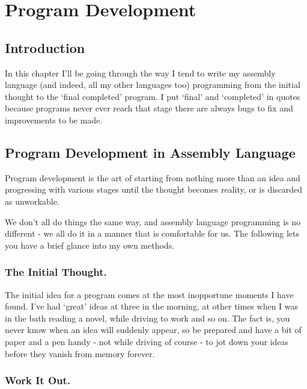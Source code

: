 \chapter{Program Development}

\section{Introduction}
\label{ch14-intro}%

In this chapter I'll be going through the way I tend to write my
    assembly language (and indeed, all my other languages too) programming
    from the initial thought to the `final completed' program. I put `final'
    and `completed' in quotes because programs never ever reach that stage
    there are always bugs to fix and improvements to be made.

\section{Program Development in Assembly Language}
\label{ch14-program-development}%

Program development is the art of starting from nothing more than an
    idea and progressing with various stages until the thought becomes
    reality, or is discarded as unworkable.

We don't all do things the same way, and assembly language
    programming is no different -{} we all do it in a manner that is comfortable
    for us. The following lets you have a brief glance into my own
    methods.

\subsection{The Initial Thought.}
\label{ch14-initial-thought}%

The initial idea for a program comes at the most inopportune
      moments I have found. I've had `great' ideas at three in the morning, at
      other times when I was in the bath reading a novel, while driving to
      work and so on. The fact is, you never know when an idea will suddenly
      appear, so be prepared and have a bit of paper and a pen handy -{} not
      while driving of course -{} to jot down your ideas before they vanish from
      memory forever.

\subsection{Work It Out.}
\label{ch14-work-it-out}%

